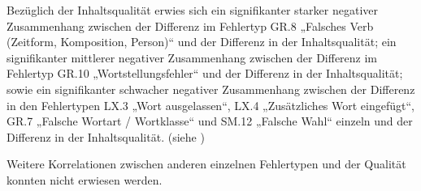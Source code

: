 Bezüglich der Inhaltsqualität erwies sich ein signifikanter starker negativer Zusammenhang zwischen der Differenz im Fehlertyp GR.8 „Falsches Verb (Zeitform, Komposition, Person)“ und der Differenz in der Inhaltsqualität; ein signifikanter mittlerer negativer Zusammenhang zwischen der Differenz im Fehlertyp GR.10 „Wortstellungsfehler“ und der Differenz in der Inhaltsqualität; sowie ein signifikanter schwacher negativer Zusammenhang zwischen der Differenz in den Fehlertypen LX.3 „Wort ausgelassen“, LX.4 „Zusätzliches Wort eingefügt“, GR.7 „Falsche Wortart / Wortklasse“ und SM.12 „Falsche Wahl“ einzeln und der Differenz in der Inhaltsqualität. (siehe )

Weitere Korrelationen zwischen anderen einzelnen Fehlertypen und der Qualität konnten nicht erwiesen werden.


